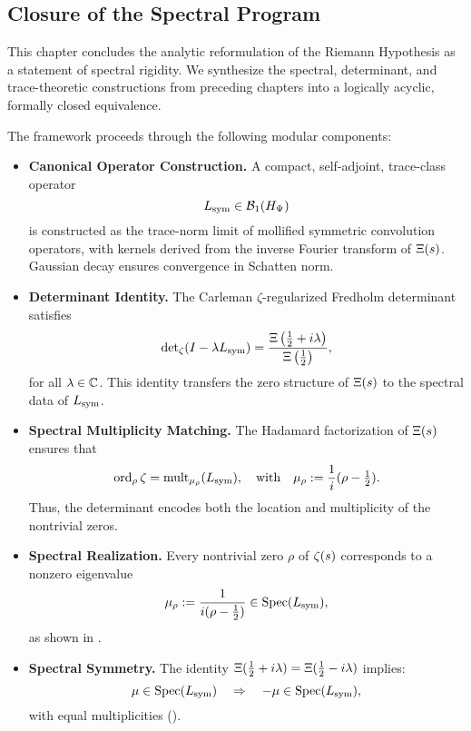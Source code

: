 \subsection*{Closure of the Spectral Program}

This chapter concludes the analytic reformulation of the Riemann Hypothesis as a statement of spectral rigidity. We synthesize the spectral, determinant, and trace-theoretic constructions from preceding chapters into a logically acyclic, formally closed equivalence.

\medskip
\noindent
The framework proceeds through the following modular components:

\begin{itemize}
  \item \textbf{Canonical Operator Construction.}  
  A compact, self-adjoint, trace-class operator
  \[
  L_{\mathrm{sym}} \in \mathcal{B}_1(H_{\Psi})
  \]
  is constructed as the trace-norm limit of mollified symmetric convolution operators, with kernels derived from the inverse Fourier transform of \( \Xi(s) \). Gaussian decay ensures convergence in Schatten norm.

  \item \textbf{Determinant Identity.}  
  The Carleman \(\zeta\)-regularized Fredholm determinant satisfies
  \[
  \det\nolimits_\zeta(I - \lambda L_{\mathrm{sym}}) = \frac{\Xi\left(\tfrac{1}{2} + i\lambda\right)}{\Xi\left(\tfrac{1}{2}\right)},
  \]
  for all \( \lambda \in \mathbb{C} \). This identity transfers the zero structure of \( \Xi(s) \) to the spectral data of \( L_{\mathrm{sym}} \).

  \item \textbf{Spectral Multiplicity Matching.}  
  The Hadamard factorization of \( \Xi(s) \) ensures that
  \[
  \operatorname{ord}_{\rho} \zeta = \operatorname{mult}_{\mu_\rho}(L_{\mathrm{sym}}),
  \quad \text{with} \quad \mu_\rho := \frac{1}{i}(\rho - \tfrac{1}{2}).
  \]
  Thus, the determinant encodes both the location and multiplicity of the nontrivial zeros.

  \item \textbf{Spectral Realization.}  
  Every nontrivial zero \( \rho \) of \( \zeta(s) \) corresponds to a nonzero eigenvalue
  \[
  \mu_\rho := \frac{1}{i(\rho - \tfrac{1}{2})} \in \operatorname{Spec}(L_{\mathrm{sym}}),
  \]
  as shown in .

  \item \textbf{Spectral Symmetry.}  
  The identity \( \Xi(\tfrac{1}{2} + i\lambda) = \Xi(\tfrac{1}{2} - i\lambda) \) implies:
  \[
  \mu \in \operatorname{Spec}(L_{\mathrm{sym}}) \quad \Rightarrow \quad -\mu \in \operatorname{Spec}(L_{\mathrm{sym}}),
  \]
  with equal multiplicities ().


\end{itemize}
